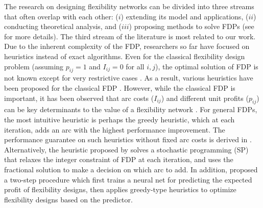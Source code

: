 \documentclass{article} %
\begin{document}
The research on designing flexibility networks can be divided into three streams that often overlap with each other: ($i$) extending its model and applications, ($ii$) conducting theoretical analysis, and ($iii$) proposing methods to solve FDPs (see \citet{chou2008process, wang2019review} for more details). The third stream of the literature is most related to our work. Due to the inherent complexity of the FDP, researchers so far have focused on heuristics instead of exact algorithms. Even for the classical flexibility design problem (assuming $p_{ij}=1$ and $I_{ij}=0$ for all $i,j$), the optimal solution of FDP is not known except for very restrictive cases \citep{desir2016sparse}. As a result, various heuristics have been proposed for the classical FDP \citep{Chou2010, Chou2011, simchi2015worst}. However, while the classical FDP is important, it has been observed that arc costs ($I_{ij}$) and different unit profits ($p_{ij}$) can be key determinants to the value of a flexibility network \citep{van1998investment, wang2019review}.
For general FDPs, the most intuitive heuristic 
is perhaps the greedy heuristic, which at each iteration, adds an arc with the highest performance improvement. The performance guarantee on such heuristics without fixed arc costs is derived in \citet{devalve2020matching}.
Alternatively, the heuristic proposed by \citet{feng2017process} solves a stochastic programming (SP) that relaxes the integer constraint of FDP at each iteration, and uses the fractional solution to make a decision on which arc to add. In addition, \citet{chan2019sparse} proposed a two-step procedure which first trains a neural net for predicting the expected profit of flexibility designs, then applies greedy-type heuristics to optimize flexibility designs based on the predictor.



\end{document}
